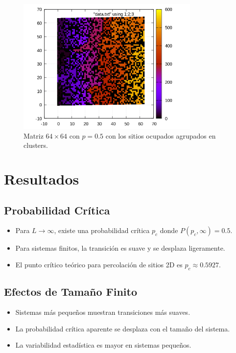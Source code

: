 \documentclass[10pt,twocolumn]{article}
\begin{document}
   \begin{figure}[htbp]
    \centering
    \includegraphics[width=9cm]{./data/merged 64 0.5.png}
    \caption{Matriz $64\times 64$ con $p = 0.5$ con los sitios ocupados agrupados en clusters.}
    \label{merged 64 0.5} 
   \end{figure} 

\section{Resultados}

\subsection*{Probabilidad Crítica}
\begin{itemize}
    \item Para $L \to \infty$, existe una probabilidad crítica $p_c$ donde $P(p_c, \infty) = 0.5$.
    \item Para sistemas finitos, la transición es suave y se desplaza ligeramente.
    \item El punto crítico teórico para percolación de sitios 2D es $p_c \approx 0.5927$.
\end{itemize}

\subsection*{Efectos de Tamaño Finito}
\begin{itemize}
    \item Sistemas más pequeños muestran transiciones más suaves.
    \item La probabilidad crítica aparente se desplaza con el tamaño del sistema.
    \item La variabilidad estadística es mayor en sistemas pequeños.
\end{itemize}
   
\end{document}
